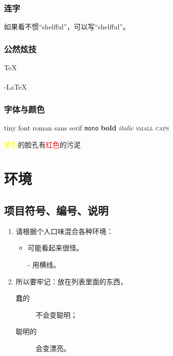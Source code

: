 \documentclass[12pt]{article}
\begin{document}
\subsubsection{连字}
如果看不惯``shelfful''，可以写``shelf\mbox{}ful''。

\subsubsection{公然炫技}
\TeX \\
\LaTeXe \\
\AmS-\LaTeX \\

\subsubsection{字体与颜色}
{\tiny{tiny font}} \textrm{roman} \textsf{sans serif} \texttt{mono} \textbf{bold} \textit{italic} \textsc{small caps}

\textcolor{yellow}{黄色}的脸孔有\textcolor{red}{红色}的污泥

\section{环境}
\subsection{项目符号、编号、说明}
\begin{enumerate}
    \item 请根据个人口味混合各种环境：
        \begin{itemize}
            \item 可能看起来很怪。
            \item[-] 用横线。
        \end{itemize}
    \item 所以要牢记：放在列表里面的东西，
        \begin{description}
            \item[蠢的]不会变聪明；
            \item[聪明的]会变漂亮。
        \end{description}
\end{enumerate}
\end{document}
